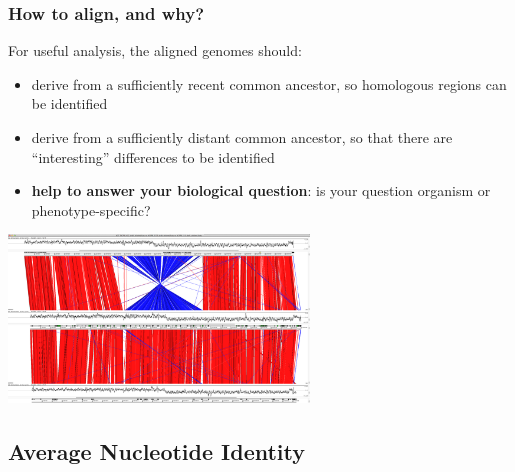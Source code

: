\begin{frame}
  \frametitle{How to align, and why?}
  For useful analysis, the aligned genomes should:
  \begin{itemize}
    \item derive from a sufficiently recent common ancestor, so homologous regions can be identified
    \item derive from a sufficiently distant common ancestor, so that there are ``interesting'' differences to be identified
    \item \textbf{help to answer your biological question}: is your question organism or phenotype-specific? 
  \end{itemize}
  \begin{center}
    \includegraphics[width=0.6\textwidth]{images/act_comparison}
  \end{center}  
\end{frame}


\subsection{Average Nucleotide Identity}

